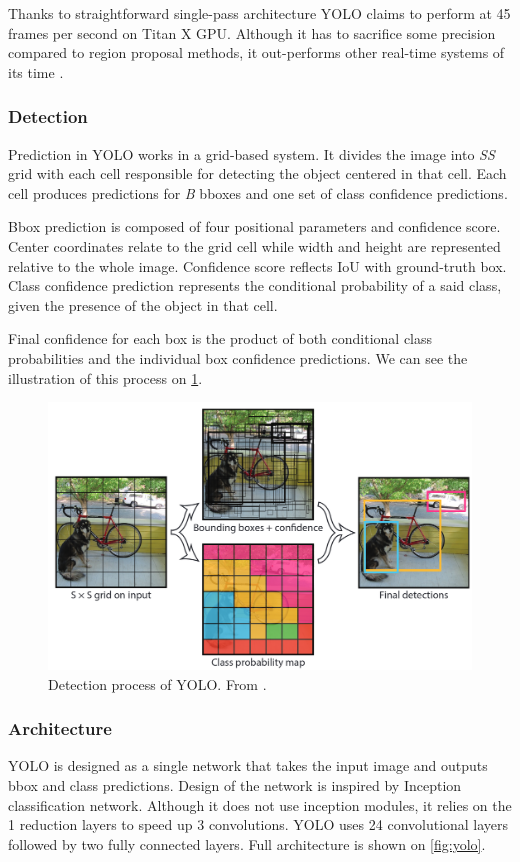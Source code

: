Thanks to straightforward single-pass architecture YOLO claims to perform at 45 frames per second on Titan X GPU. Although it has to sacrifice some precision compared to region proposal methods, it out-performs other real-time systems of its time \cite{bib:overfeat}.


\subsubsection{Detection}
Prediction in YOLO works in a grid-based system. It divides the image into \textit{S\x S} grid with each cell responsible for detecting the object centered in that cell.  Each cell produces predictions for \textit{B} bboxes and one set of class confidence predictions. 

Bbox prediction is composed of four positional parameters and confidence score. Center coordinates relate to the grid cell while width and height are represented relative to the whole image. Confidence score reflects IoU with ground-truth box. Class confidence prediction represents the conditional probability of a said class, given the presence of the object in that cell. 

Final confidence for each box is the product of both conditional class probabilities and the individual box confidence predictions. We can see the illustration of this process on \cref{fig:yoloDet}.

\begin{figure}
    \centering
    \includegraphics[width=\textwidth]{img/yoloDet}
    \caption[YOLO detection]%
    {Detection process of YOLO. From \cite[fig. 2]{bib:yolo}.}
    \label{fig:yoloDet} 
\end{figure}


\subsubsection{Architecture} 
YOLO is designed as a single network that takes the input image and outputs bbox and class predictions. Design of the network is inspired by Inception classification network. Although it does not use inception modules, it relies on the 1 reduction layers to speed up 3 convolutions. YOLO uses 24 convolutional layers followed by two fully connected layers. Full architecture is shown on \cref{fig:yolo}. 

